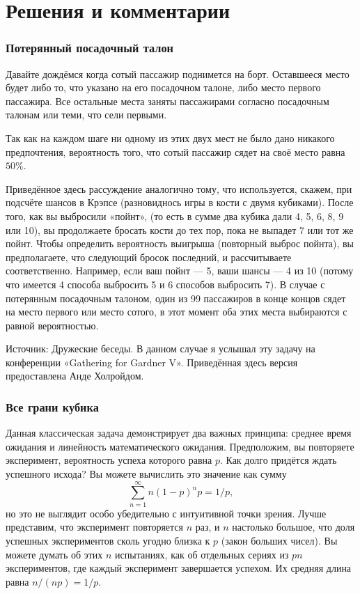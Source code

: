 \section*{Решения и комментарии}

\subsubsection*{Потерянный посадочный талон}%

Давайте дождёмся когда сотый пассажир поднимется на борт. 
Оставшееся место будет либо то, что указано на его посадочном талоне, либо место первого пассажира.
Все остальные места заняты пассажирами согласно посадочным талонам или теми, что сели первыми.

Так как на каждом шаге ни одному из этих двух мест не было дано никакого предпочтения, вероятность того, что сотый пассажир сядет на своё место равна $50\%$.
\heart

Приведённое здесь рассуждение аналогично тому, что используется, скажем, при подсчёте шансов в Крэпсе (разновиднось игры в кости с двумя кубиками).
После того, как вы выбросили «пойнт»,
(то есть в сумме два кубика дали 4, 5, 6, 8, 9 или 10), вы продолжаете бросать кости до тех пор, пока не выпадет 7 или тот же пойнт.
Чтобы определить вероятность выигрыша (повторный выброс пойнта), вы предполагаете, что следующий бросок последний, и рассчитываете соответственно.
Например, если ваш пойнт --- 5, ваши шансы --- 4 из 10 (потому что имеется 4 способа выбросить 5 и 6 способов выбросить 7).
В случае с потерянным посадочным талоном, один из 99 пассажиров в конце концов сядет на место первого или место сотого, в этот момент оба этих места выбираются с равной вероятностью. 

\medskip

Источник: Дружеские беседы.
В данном случае я услышал эту задачу на конференции «Gathering for Gardner V».
Приведённая здесь версия предоставлена Анде Холройдом. %

\subsubsection*{Все грани кубика}%

Данная классическая задача демонстрирует два важных принципа: среднее время ожидания и линейность математического ожидания. %
Предположим, вы повторяете эксперимент, вероятность успеха которого равна $p$.
Как долго придётся ждать успешного исхода? Вы можете вычислить это значение как сумму
\[\sum_{n=1}^\infty n(1-p)^np=1/p,\]
но это не выглядит особо убедительно с интуитивной точки зрения.
Лучше представим, что эксперимент повторяется $n$ раз, и $n$ настолько большое, что доля успешных экспериментов сколь угодно близка к $p$ (закон больших чисел).
Вы можете думать об этих $n$ испытаниях, как об отдельных сериях из $pn$ экспериментов, где каждый эксперимент завершается успехом.
Их средняя длина равна $n/(np)=1/p$.

